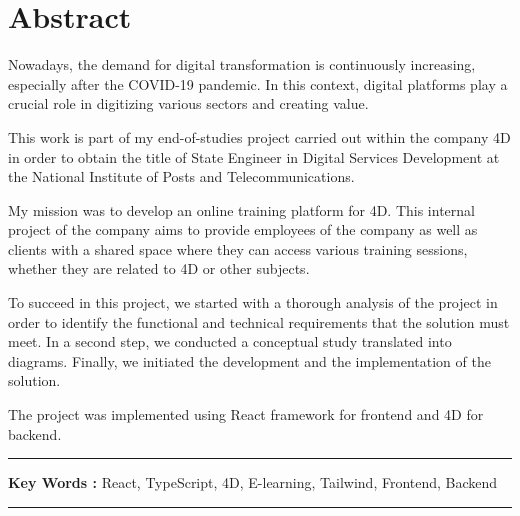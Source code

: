 \chapter*{Abstract}

Nowadays, the demand for digital transformation is continuously increasing, especially after the COVID-19 pandemic. In this context, digital platforms play a crucial role in digitizing various sectors and creating value.

\vspace{10pt}


This work is part of my end-of-studies project carried out within the company 4D in order to obtain the title of State Engineer in Digital Services Development at the National Institute of Posts and Telecommunications.

\vspace{10pt}

My mission was to develop an online training platform for 4D. This internal project of the company aims to provide employees of the company as well as clients with a shared space where they can access various training sessions, whether they are related to 4D or other subjects.

\vspace{10pt}

To succeed in this project, we started with a thorough analysis of the project in order to identify the functional and technical requirements that the solution must meet. In a second step, we conducted a conceptual study translated into diagrams. Finally, we initiated the development and the implementation of the solution.

\vspace{10pt}

The project was implemented using React framework for frontend and 4D for backend.

\vspace{10pt}

\noindent\rule[2pt]{\textwidth}{0.5pt}

{\textbf{Key Words :}}
React, TypeScript, 4D, E-learning, Tailwind, Frontend, Backend 
\\
\noindent\rule[2pt]{\textwidth}{0.5pt}